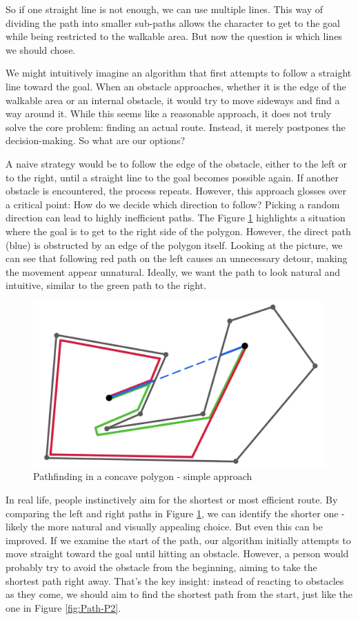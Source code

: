 So if one straight line is not enough, we can use multiple lines. This way of dividing the path into smaller sub-paths allows the character to get to the goal while being restricted to the walkable area. But now the question is which lines we should chose.

We might intuitively imagine an algorithm that first attempts to follow a straight line toward the goal. When an obstacle approaches, whether it is the edge of the walkable area or an internal obstacle, it would try to move sideways and find a way around it. While this seems like a reasonable approach, it does not truly solve the core problem: finding an actual route. Instead, it merely postpones the decision-making. So what are our options?

A naive strategy would be to follow the edge of the obstacle, either to the left or to the right, until a straight line to the goal becomes possible again. If another obstacle is encountered, the process repeats. However, this approach glosses over a critical point: How do we decide which direction to follow? Picking a random direction can lead to highly inefficient paths. The Figure \ref{fig:Path-P}  highlights a situation where the goal is to get to the right side of the polygon. However, the direct path (blue) is obstructed by an edge of the polygon itself. Looking at the picture, we can see that following red path on the left causes an unnecessary detour, making the movement appear unnatural. Ideally, we want the path to look natural and intuitive, similar to the green path to the right.

\begin{figure}[H]
\centering
\includegraphics[width=.7\linewidth]{img/polygon-prototyp.png}
\caption{Pathfinding in a concave polygon - simple approach}
\label{fig:Path-P}
\end{figure}

In real life, people instinctively aim for the shortest or most efficient route. By comparing the left and right paths in Figure \ref{fig:Path-P}, we can identify the shorter one - likely the more natural and visually appealing choice. But even this can be improved. If we examine the start of the path, our algorithm initially attempts to move straight toward the goal until hitting an obstacle. However, a person would probably try to avoid the obstacle from the beginning, aiming to take the shortest path right away. That’s the key insight: instead of reacting to obstacles as they come, we should aim to find the shortest path from the start, just like the one in Figure \ref{fig:Path-P2}.
 
